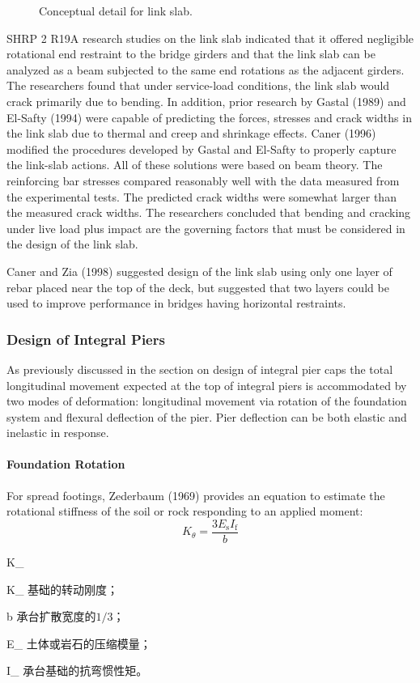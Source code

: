 \begin{figure}
  \caption{Conceptual detail for link slab.}
  \label{fig:conceptual-detail-link-slab}
\end{figure}

SHRP 2 R19A research studies on the link slab indicated that it offered negligible rotational end restraint to the
bridge girders and that the link slab can be analyzed as a beam subjected to the same end rotations as the adjacent
girders. The researchers found that under service-load conditions, the link slab would crack primarily due to bending.
In addition, prior research by Gastal (1989) and El-Safty (1994) were capable of predicting the forces, stresses and
crack widths in the link slab due to thermal and creep and shrinkage effects. Caner (1996) modified the procedures
developed by Gastal and El-Safty to properly capture the link-slab actions. All of these solutions were based on beam
theory. The reinforcing bar stresses compared reasonably well with the data measured from the experimental tests.
The predicted crack widths were somewhat larger than the measured crack widths. The researchers concluded that
bending and cracking under live load plus impact are the governing factors that must be considered in the design of
the link slab.

Caner and Zia (1998) suggested design of the link slab using only one layer of rebar placed near the top of the
deck, but suggested that two layers could be used to improve performance in bridges having horizontal restraints.

\subsubsection{Design of Integral Piers}
As previously discussed in the section on design of integral pier caps the total longitudinal movement expected at the top of integral piers is accommodated by two modes of deformation: longitudinal movement via rotation of the foundation system and flexural deflection of the pier. Pier deflection can be both elastic and inelastic in response.

\paragraph{Foundation Rotation}
For spread footings, Zederbaum (1969) provides an equation to estimate the rotational stiffness of the soil or rock responding to an applied moment:
\begin{equation}
  K_\theta=\frac{3E_\text{s}I_\text{f}}{b}
\end{equation}
\begin{EqDesc}{K_\theta}
  \item[K_\theta] 基础的转动刚度；
  \item[b] 承台扩散宽度的$1/3$；
  \item[E_\text{s}] 土体或岩石的压缩模量；
  \item[I_\text{f}] 承台基础的抗弯惯性矩。
\end{EqDesc}

